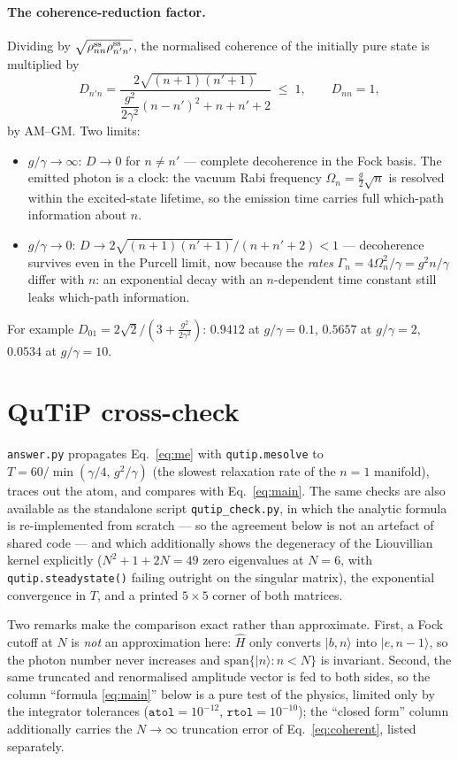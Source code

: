 \documentclass[11pt,a4paper]{article}
\newcommand{\ket}[1]{\lvert #1\rangle}
\begin{document}
\paragraph{The coherence-reduction factor.}
Dividing by $\sqrt{\rho^{\rm ss}_{nn}\rho^{\rm ss}_{n'n'}}$, the normalised
coherence of the initially pure state is multiplied by
\begin{equation}
  D_{n'n}=\frac{2\sqrt{(n+1)(n'+1)}}
  {\dfrac{g^{2}}{2\gamma^{2}}(n-n')^{2}+n+n'+2}\;\le\;1,
  \qquad D_{nn}=1,
  \label{eq:D}
\end{equation}
by AM--GM.  Two limits:
\begin{itemize}\itemsep2pt
\item $g/\gamma\to\infty$: $D\to0$ for $n\neq n'$ --- complete decoherence in
the Fock basis.  The emitted photon is a clock: the vacuum Rabi frequency
$\Omega_n=\tfrac{g}{2}\sqrt n$ is resolved within the excited-state lifetime, so
the emission time carries full which-path information about $n$.
\item $g/\gamma\to0$: $D\to2\sqrt{(n+1)(n'+1)}/(n+n'+2)<1$ --- decoherence
survives even in the Purcell limit, now because the \emph{rates}
$\Gamma_n=4\Omega_n^{2}/\gamma=g^{2}n/\gamma$ differ with $n$: an exponential
decay with an $n$-dependent time constant still leaks which-path information.
\end{itemize}
For example $D_{01}=2\sqrt2/(3+\tfrac{g^{2}}{2\gamma^{2}})$: $0.9412$ at
$g/\gamma=0.1$, $0.5657$ at $g/\gamma=2$, $0.0534$ at $g/\gamma=10$.

\section{QuTiP cross-check}
\label{sec:qutip}

\texttt{answer.py} propagates Eq.~\eqref{eq:me} with \texttt{qutip.mesolve} to
$T=60/\min(\gamma/4,\,g^{2}/\gamma)$ (the slowest relaxation rate of the $n=1$
manifold), traces out the atom, and compares with Eq.~\eqref{eq:main}.  The
same checks are also available as the standalone script
\texttt{qutip\_check.py}, in which the analytic formula is re-implemented from
scratch --- so the agreement below is not an artefact of shared code --- and
which additionally shows the degeneracy of the Liouvillian kernel explicitly
($N^{2}+1+2N=49$ zero eigenvalues at $N=6$, with
\texttt{qutip.steadystate()} failing outright on the singular matrix),
the exponential convergence in $T$, and a printed $5\times5$ corner of both
matrices.

Two remarks make the comparison exact rather than approximate.  First, a Fock
cutoff at $N$ is \emph{not} an approximation here: $\hat H$ only converts
$\ket{b,n}$ into $\ket{e,n-1}$, so the photon number never increases and
$\mathrm{span}\{\ket n:n<N\}$ is invariant.  Second, the same truncated and
renormalised amplitude vector is fed to both sides, so the column
``formula \eqref{eq:main}'' below is a pure test of the physics, limited only by
the integrator tolerances ($\texttt{atol}=10^{-12}$,
$\texttt{rtol}=10^{-10}$); the ``closed form'' column additionally carries the
$N\to\infty$ truncation error of Eq.~\eqref{eq:coherent}, listed separately.
\end{document}
